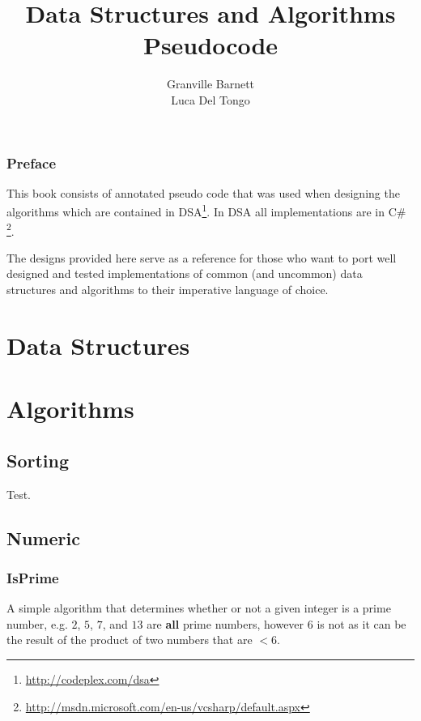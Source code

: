 \documentclass[10pt,oneside,a4paper]{report}
\begin{document}
\title{Data Structures and Algorithms\\Pseudocode}
\author{Granville Barnett\\Luca Del Tongo}
\maketitle

\newpage
\tableofcontents
\newpage

\section*{Preface}
This book consists of annotated pseudo code that was used when designing the algorithms which are contained in DSA\footnote{\url{http://codeplex.com/dsa}}. In DSA all implementations are in C\# \footnote{\url{http://msdn.microsoft.com/en-us/vcsharp/default.aspx}}.

The designs provided here serve as a reference for those who want to port well designed and tested implementations of common (and uncommon) data structures and algorithms to their imperative language of choice.

\pagestyle{headings}

\part{Data Structures}

\part{Algorithms}

\chapter{Sorting}
Test.

\chapter{Numeric}
\section{IsPrime}
A simple algorithm that determines whether or not a given integer is a prime number, e.g. $2$, $5$, $7$, and $13$ are \textbf{all} prime numbers, however $6$ is not as it can be the result of the product of two numbers that are $< 6$.
\end{document}
